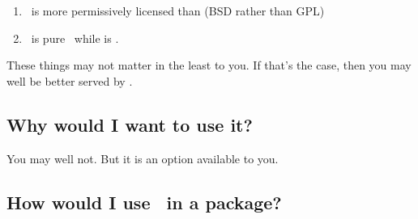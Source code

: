 \begin{enumerate}
  \item \thispackage\ is more permissively licensed than  (BSD rather than GPL)
  \item \thispackage\ is pure \C\, while  is \Cpp.
\end{enumerate}

These things may not matter in the least to you.  If that's the case, then you
may well be better served by .



\subsection{Why would I want to use it?}

You may well not.  But it is an option available to you.


\subsection{How would I use \thispackage\ in a package?}

